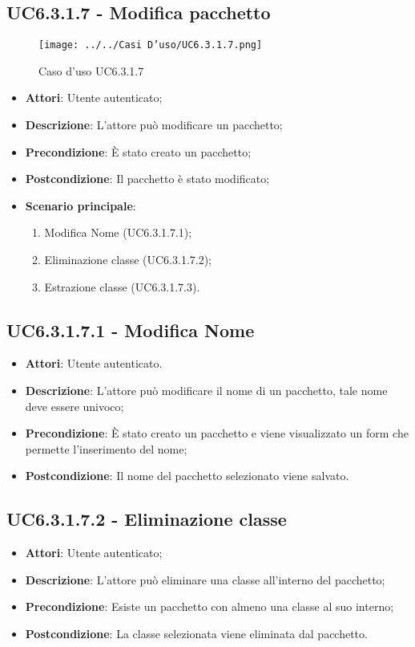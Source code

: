 \subsection{UC6.3.1.7 - Modifica pacchetto} 
\label{ssec:UC6.3.1.7} 
\begin{figure}[h!] 
\centering 
\texttt{[image: ../../Casi D'uso/UC6.3.1.7.png]} 
\caption{Caso d'uso UC6.3.1.7} 
 \end{figure} 
\begin{itemize} 
\item \textbf{Attori}: Utente autenticato;
\item \textbf{Descrizione}: L'attore può modificare un pacchetto;
\item \textbf{Precondizione}: È stato creato un pacchetto;
\item \textbf{Postcondizione}: Il pacchetto è stato modificato;
\item \textbf{Scenario principale}: \begin{enumerate}\item Modifica Nome (UC6.3.1.7.1);\item Eliminazione classe (UC6.3.1.7.2);\item Estrazione classe (UC6.3.1.7.3). 
 \end{enumerate}
\end{itemize} 
\subsection{UC6.3.1.7.1 - Modifica Nome} 
\label{ssec:UC6.3.1.7.1} 
\begin{itemize} 
\item \textbf{Attori}: Utente autenticato.
\item \textbf{Descrizione}: L'attore può modificare il nome di un pacchetto, tale nome deve essere univoco;
\item \textbf{Precondizione}: È stato creato un pacchetto e viene visualizzato un form che permette l'inserimento del nome;
\item \textbf{Postcondizione}: Il nome del pacchetto selezionato viene salvato.
\end{itemize} 
\subsection{UC6.3.1.7.2 - Eliminazione classe} 
\label{ssec:UC6.3.1.7.2} 
\begin{itemize} 
\item \textbf{Attori}: Utente autenticato;
\item \textbf{Descrizione}: L'attore può eliminare una classe all'interno del pacchetto;
\item \textbf{Precondizione}: Esiste un pacchetto con almeno una classe al suo interno;
\item \textbf{Postcondizione}: La classe selezionata viene eliminata dal pacchetto.
\end{itemize} 
